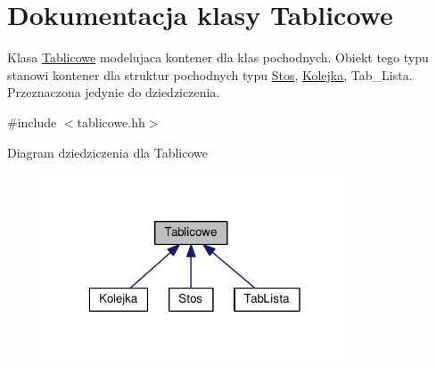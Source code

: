 \hypertarget{class_tablicowe}{\section{Dokumentacja klasy Tablicowe}
\label{class_tablicowe}
}


Klasa \hyperlink{class_tablicowe}{Tablicowe} modelujaca kontener dla klas pochodnych. Obiekt tego typu stanowi kontener dla struktur pochodnych typu \hyperlink{struct_stos}{Stos}, \hyperlink{class_kolejka}{Kolejka}, Tab\-\_\-\-Lista. Przeznaczona jedynie do dziedziczenia.  




{\ttfamily \#include $<$tablicowe.\-hh$>$}



Diagram dziedziczenia dla Tablicowe
\nopagebreak
\begin{figure}[H]
\begin{center}
\leavevmode
\includegraphics[width=256pt]{class_tablicowe__inherit__graph}
\end{center}
\end{figure}
